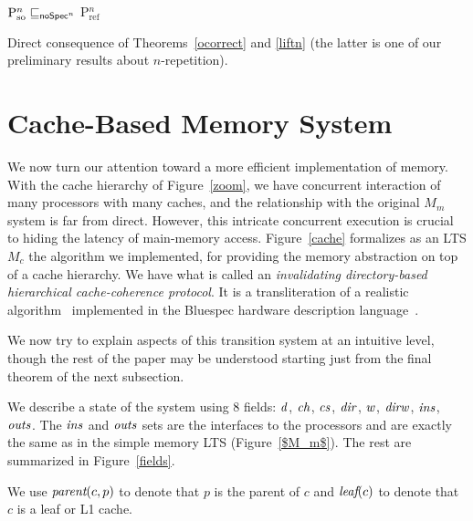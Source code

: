 \begin{corollary}
\label{ges}
$\text{P$^n_\text{so}$} \sqsubseteq_{\mathsf{noSpec}^n}$ P$_\text{ref}^n$
\end{corollary}
\begin{prf}
Direct consequence of Theorems~\ref{ocorrect} and \ref{liftn} (the
latter is one of our preliminary results about $n$-repetition).
\end{prf}

\section{Cache-Based Memory System}\label{sec:cc}



We now turn our attention toward a more efficient implementation of
memory.  With the cache hierarchy of Figure~\ref{zoom}, we have concurrent
interaction of many processors with many caches, and the relationship with the original $M_m$ system
is far from direct.  However, this intricate concurrent execution is
crucial to hiding the latency of main-memory access.
Figure~\ref{cache} formalizes as an LTS $M_c$ the algorithm we implemented,
for providing the memory abstraction on top of a cache hierarchy.
We have what is called an \emph{invalidating directory-based hierarchical
cache-coherence protocol}.  It is a transliteration of a realistic
algorithm~\cite{DNA:CoherenceImplementation} implemented in the
Bluespec hardware description language~\cite{Bluespec:TFRG}. 

We now try to explain aspects of this transition system at an
intuitive level, though the rest of the paper may be understood starting just
from the final theorem of the next subsection.

We describe a state of the system using 8 fields: $\mathit{d}$, $\mathit{ch}$, $\mathit{cs}$, $\mathit{dir}$,
$\mathit{w}$, $\mathit{dirw}$, $\mathit{ins}$, $\mathit{outs}$. The $\mathit{ins}$ and $\mathit{outs}$ sets are the interfaces
to the processors and are exactly the same as in the simple memory LTS
(Figure~\ref{$M_m$}). The rest are summarized in Figure~\ref{fields}.

We use $\textit{parent}(c,p)$ to denote that $p$ is the parent of $c$ and $\textit{leaf}(c)$ to 
denote that $c$ is a leaf or L1 cache.

